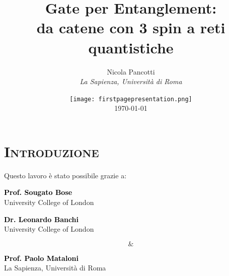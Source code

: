 \documentclass[xcolor=x11names,compress]{beamer}
\renewcommand{\(}{\begin{columns}}
\renewcommand{\)}{\end{columns}}
\newcommand{\<}[1]{\begin{column}{#1}}
\renewcommand{\>}{\end{column}}
\begin{document}
\section{\scshape Introduzione}
\begin{frame}
\title{\textbf{Gate per Entanglement:} \\ da catene con 3 spin a reti quantistiche}
\author{
	Nicola Pancotti\\
	{\it La Sapienza, Università di Roma}}
\date{\texttt{[image: firstpagepresentation.png]}\\
	\vspace{0.1cm}
	\today
}
\titlepage
\end{frame}

\begin{frame}{Questo lavoro è stato possibile grazie a:}


\vspace{-1cm}

\begin{multicols}{2}

\begin{center}
\textbf{\textcolor{black}{\large{Prof. Sougato Bose}}}\\
\textcolor{mygray}{University College of London}\end{center}

\columnbreak
\hspace{.5cm}

\vspace{-0.9cm}
\begin{center}
\textbf{\textcolor{black}{\large{Dr. Leonardo Banchi}}}\\ 
\textcolor{mygray}{University College of London}\end{center}

\end{multicols}

\vspace{-.3cm}

$$\&$$

\begin{center}
\textbf{\textcolor{black}{\large{Prof. Paolo Mataloni}}} \\
\textcolor{mygray}{La Sapienza, Università di Roma}\end{center}

\end{frame}
\end{document}
